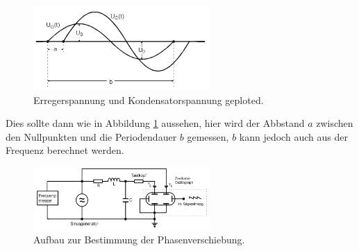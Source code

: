 \begin{figure}[H]
    \centering
    \includegraphics[width=0.6\textwidth]{images/5dplot.PNG}
    \caption{Erregerspannung und Kondensatorspannung geploted.}
    \label{img:5dplot}
\end{figure}

\noindent Dies sollte dann wie in Abbildung \ref{img:5dplot} aussehen, hier wird der Abbstand $a$ zwischen den Nullpunkten und die Periodendauer $b$ 
gemessen, $b$ kann jedoch auch aus der Frequenz berechnet werden.


\begin{figure}[H]
    \centering
    \includegraphics[width=0.6\textwidth]{images/5d.PNG}
    \caption{Aufbau zur Bestimmung der Phasenverschiebung.}
    \label{img:5d}
\end{figure}